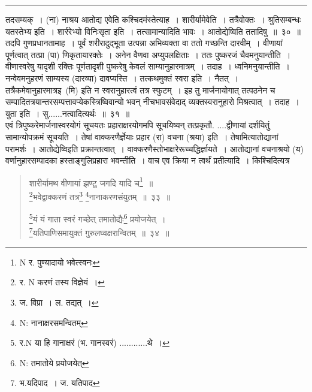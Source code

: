 \documentclass[11pt, openany]{book}
\begin{document}
\hrule

\vspace{2mm}
{\qtt तदसम्यक्}~। (ना) नाश्रय आतोद्य एवेति कश्चिदमंस्तेत्याह~। शारीर्यामेवेति~। {\qtt तत्रैवोक्तः}~। श्रुतिसम्बन्धः यतस्तेभ्य इति~। शार्ररेभ्यो विनिःसृता इति~। {\qtt तत्सामान्यादिति} भावः~। आतोद्येष्विति ततादिषु~॥~३०~॥\\

तदपि {\qtt गुणप्रधानतामाह}~। पूर्वं शरीरादुद्भूता उत्पन्ना अभिव्यक्ता वा ततो गच्छन्ति दारवीम्~। वीणायां पूर्णत्वात् तत्प्रा (पा) णिकृतायारक्तेः~। अनेन वैणवा {\qtt अप्युपलक्षिताः}~। ततः पुष्करजं चैवमनुयान्तीति~। वीणास्वरेषु यादृशी रक्तिः पूर्णतादृशी पुष्करेषु केवलं साम्यानुहारमात्रम्~। तदाह~। {\qtt ध्वनिमनुयान्तीति}~। \\

नन्वेवमनुहरणं साम्यस्य (दारव्या) दावप्यस्ति~। तत्कथमुक्तं स्वरा इति~। नैतत्~। तत्रैकमेवानुहारमात्रइ\textendash\  (मि) इति न स्वरानुहारत्वं तत्र स्फुटम्~। इह तु मार्जनायोगात् तत्पठनेन च सम्पादितत्रयान्तरसम्पत्तावप्येकस्त्रिष्विवान्यो भवन् नीचभावसंवेदाद् व्यक्तस्वरानुहारो मिश्रत्वात्~। तदाह~। युता इति~। सु......नत्वादित्यर्थः~॥~३१~॥\\

एवं त्रिपुष्करेमार्जनास्वरयोगं सूचयतः प्रहाराक्षरयोगमपि सूचयिष्यन् तत्प्रकृतौ. ....द्वीणायां दर्शयितुं सामान्योपक्रमं सूचयति~। {\qtt तेषां वाक्करणैर्ज्ञेयाः प्रहार (रा) वचना (श्रया)} इति~। तेषामित्यातोद्यानां परामर्शः~। आतोद्येष्विइति प्रक्रान्तत्वात्~। वाक्करणैस्तोभाक्षरेरूच्चद्धिर्ज्ञायते~। आतोद्यानां वचनाश्रयो  (य) वर्णानुहारसम्पादका हस्ताङ्गुलिप्रहारा भवन्तीति~। वाच एव क्रिया न त्वर्थं प्रतीत्यादि~। किश्चिदित्यत्र

\newpage

\begin{quote}
{\na  शारीर्यामथ वीणायां झण्टु जगदि यादि च\renewcommand{\thefootnote}{1}\footnote{N र. पुण्यादायो भवेत्स्वनः}~॥\\
 \renewcommand{\thefootnote}{2}\footnote{र. N करणं तस्य विज्ञेयं~।}भवेद्वाक्करणं तत्र\renewcommand{\thefootnote}{3}\footnote{ज. विप्रा~। ल. तद्यत्~।} \renewcommand{\thefootnote}{3a}\footnote{N: नानाक्षरसमन्वितम्}नानाकरणसंयुतम्~॥~३३~॥

 \renewcommand{\thefootnote}{4}\footnote{र.N या हि गानाक्षरं (भ. गानस्वरं) ............थे~।}यं यं गाता स्वरं गच्छेत् तमातोद्यैः\renewcommand{\thefootnote}{4a}\footnote{N: तमातोये प्रयोजयेत्} प्रयोजयेत्~।\\
 \renewcommand{\thefootnote}{5}\footnote{भ.यदिपाद~। ज. यतिपाद}यतिपाणिसमायुक्तं गुरुलघ्वक्षरान्वितम्~॥~३४~॥}
\end{quote}
\end{document}
